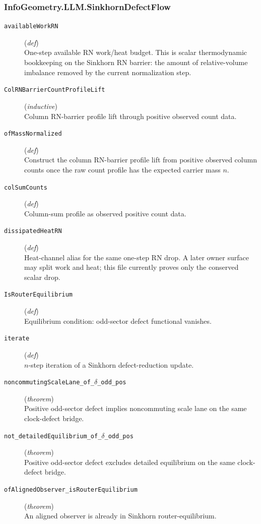 \documentclass[11pt,a4paper]{article}
\begin{document}
\subsubsection*{InfoGeometry.LLM.SinkhornDefectFlow}
\begin{description}
  \item[\texttt{availableWorkRN}] (\textit{def}) \\ One-step available RN work/heat budget. 
This is scalar thermodynamic bookkeeping on the Sinkhorn RN barrier: the amount 
of relative-volume imbalance removed by the current normalization step.
  \item[\texttt{ColRNBarrierCountProfileLift}] (\textit{inductive}) \\ Column RN-barrier profile lift through positive observed count data.
  \item[\texttt{ofMassNormalized}] (\textit{def}) \\ Construct the column RN-barrier profile lift from positive observed column 
counts once the raw count profile has the expected carrier mass $n$.
  \item[\texttt{colSumCounts}] (\textit{def}) \\ Column-sum profile as observed positive count data.
  \item[\texttt{dissipatedHeatRN}] (\textit{def}) \\ Heat-channel alias for the same one-step RN drop. A later owner surface may 
split work and heat; this file currently proves only the conserved scalar drop.
  \item[\texttt{IsRouterEquilibrium}] (\textit{def}) \\ Equilibrium condition: odd-sector defect functional vanishes.
  \item[\texttt{iterate}] (\textit{def}) \\ $n$-step iteration of a Sinkhorn defect-reduction update.
  \item[\texttt{noncommutingScaleLane\_of\_$\delta $\_odd\_pos}] (\textit{theorem}) \\ Positive odd-sector defect implies noncommuting scale lane on the same 
clock-defect bridge.
  \item[\texttt{not\_detailedEquilibrium\_of\_$\delta $\_odd\_pos}] (\textit{theorem}) \\ Positive odd-sector defect excludes detailed equilibrium on the same 
clock-defect bridge.
  \item[\texttt{ofAlignedObserver\_isRouterEquilibrium}] (\textit{theorem}) \\ An aligned observer is already in Sinkhorn router-equilibrium.

\end{description}
\end{document}
